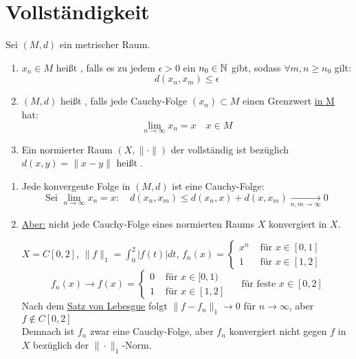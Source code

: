 


\section{Vollst{\"a}ndigkeit}



\begin{definition}
	Sei $(M, d)$ ein metrischer Raum.
	\begin{enumerate}[label=\alph*\upshape)]
		\item $x_{n} \in M$ hei{\ss}t , falls es zu jedem $\epsilon > 0$ ein $n_{0} \in \mathbb{N}$ gibt, sodass $\forall m, n \geq n_{0}$ gilt:
			\[ d(x_{n}, x_{m}) \leq \epsilon \]
		\item $(M, d)$ hei{\ss}t , falls jede Cauchy-Folge $(x_{n}) \subset M$ einen Grenzwert \uline{in M} hat:
			\[ \lim_{n \rightarrow \infty} x_{n} = x \quad x \in M \]
		\item Ein normierter Raum $(X, \| \cdot \|)$ der vollständig ist bezüglich $d(x, y) = \| x - y \|$ heißt .
	\end{enumerate}
\end{definition}


\begin{bemerkung}
	\begin{enumerate}[label=\alph*\upshape)]
		\item Jede konvergente Folge in $(M, d)$ ist eine Cauchy-Folge:
			\[ \text{Sei } \lim_{n \rightarrow \infty} x_{n} = x: \quad d(x_{n}, x_{m}) \leq d(x_{n}, x) + d(x, x_{m}) \xrightarrow[n, m \rightarrow \infty]{} 0 \]
		\item \uline{Aber:} nicht jede Cauchy-Folge eines normierten Raums $X$ konvergiert in $X$.
			\begin{beispiel*}
				$X = C[0, 2]$, $\| f \|_{1} = \int_{0}^{2} | f(t) | dt$, $f_{n}(x) = \begin{cases}x^{n} & \text{ für } x \in [0, 1] \\ 1 & \text{ für } x \in [1, 2]\end{cases}$	
				\[ f_{n}(x) \rightarrow f(x) = \begin{cases} 0 & \text{ für } x \in [0, 1) \\ 1 & \text{ für } x \in [1, 2] \end{cases} \quad \text{ für feste } x \in [0, 2] \]
				Nach dem \hyperref[satz:x-SatzvonLebesgue]{Satz von Lebesgue} folgt $\| f - f_{n} \|_{1} \rightarrow 0$ für $n \rightarrow \infty$, aber $f \notin C[0, 2]$ \\
				Demnach ist $f_{n}$ zwar eine Cauchy-Folge, aber $f_{n}$ konvergiert nicht gegen $f$ in $X$ bezüglich der $\| \cdot \|_{1}$-Norm.
			\end{beispiel*}
	\end{enumerate}	
\end{bemerkung}


